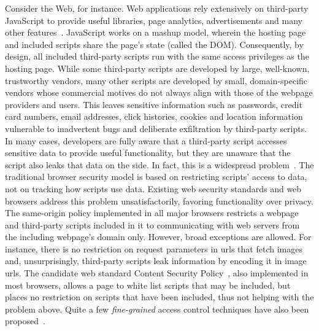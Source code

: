 Consider the Web, for instance. Web applications rely extensively on
third-party JavaScript to provide useful libraries, page analytics,
advertisements and many other features~\cite{nick12CCS}. JavaScript
works on a mashup model, wherein the hosting page and included scripts
share the page’s state (called the DOM). Consequently, by design, all
included third-party scripts run with the same access privileges as
the hosting page. While some third-party scripts are developed by
large, well-known, trustworthy vendors, many other scripts are
developed by small, domain-specific vendors whose commercial motives
do not always align with those of the 
webpage providers and users. This leaves sensitive information such as
passwords, credit card numbers, email addresses, click histories,
cookies and location information vulnerable to inadvertent bugs and
deliberate exfiltration by third-party scripts. In many cases,
developers are fully aware that a third-party script accesses
sensitive data to provide useful functionality, but they are unaware
that the script also leaks that data on the side. In fact, this is a
widespread problem~\cite{jang10CCS}. 
%
The traditional browser security
model is based on restricting scripts’ access to data, not on tracking
how scripts use data. Existing web security standards
and web browsers address this problem unsatisfactorily, favoring
functionality over privacy. The same-origin policy implemented
in all major browsers restricts a webpage and third-party scripts
included in it to communicating with web servers from the including
webpage’s domain only. However, broad exceptions are allowed. For
instance, there is no restriction on request parameters in urls that
fetch images and, unsurprisingly, third-party scripts leak information
by encoding it in image urls. The candidate web standard Content
Security Policy~\cite{csp}, also implemented in most browsers,
allows a page to white list scripts that may be included, but places
no restriction on scripts that have been included, thus not helping
with the problem above. 
%
Quite a few \emph{fine-grained} access control
techniques have also been proposed~\cite{conscript, adjail,
  zhouESORICS11, ccs13crypton, adsafe, fbjs, caja, webjail}. 
